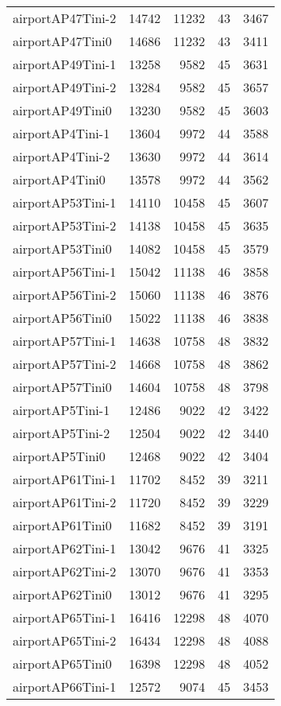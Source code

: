 \begin{longtable}{lrrrr}
airportAP47Tini-2 & 14742 & 11232 & 43 & 3467 \\
airportAP47Tini0 & 14686 & 11232 & 43 & 3411 \\
airportAP49Tini-1 & 13258 & 9582 & 45 & 3631 \\
airportAP49Tini-2 & 13284 & 9582 & 45 & 3657 \\
airportAP49Tini0 & 13230 & 9582 & 45 & 3603 \\
airportAP4Tini-1 & 13604 & 9972 & 44 & 3588 \\
airportAP4Tini-2 & 13630 & 9972 & 44 & 3614 \\
airportAP4Tini0 & 13578 & 9972 & 44 & 3562 \\
airportAP53Tini-1 & 14110 & 10458 & 45 & 3607 \\
airportAP53Tini-2 & 14138 & 10458 & 45 & 3635 \\
airportAP53Tini0 & 14082 & 10458 & 45 & 3579 \\
airportAP56Tini-1 & 15042 & 11138 & 46 & 3858 \\
airportAP56Tini-2 & 15060 & 11138 & 46 & 3876 \\
airportAP56Tini0 & 15022 & 11138 & 46 & 3838 \\
airportAP57Tini-1 & 14638 & 10758 & 48 & 3832 \\
airportAP57Tini-2 & 14668 & 10758 & 48 & 3862 \\
airportAP57Tini0 & 14604 & 10758 & 48 & 3798 \\
airportAP5Tini-1 & 12486 & 9022 & 42 & 3422 \\
airportAP5Tini-2 & 12504 & 9022 & 42 & 3440 \\
airportAP5Tini0 & 12468 & 9022 & 42 & 3404 \\
airportAP61Tini-1 & 11702 & 8452 & 39 & 3211 \\
airportAP61Tini-2 & 11720 & 8452 & 39 & 3229 \\
airportAP61Tini0 & 11682 & 8452 & 39 & 3191 \\
airportAP62Tini-1 & 13042 & 9676 & 41 & 3325 \\
airportAP62Tini-2 & 13070 & 9676 & 41 & 3353 \\
airportAP62Tini0 & 13012 & 9676 & 41 & 3295 \\
airportAP65Tini-1 & 16416 & 12298 & 48 & 4070 \\
airportAP65Tini-2 & 16434 & 12298 & 48 & 4088 \\
airportAP65Tini0 & 16398 & 12298 & 48 & 4052 \\
airportAP66Tini-1 & 12572 & 9074 & 45 & 3453 \\

\end{longtable}
